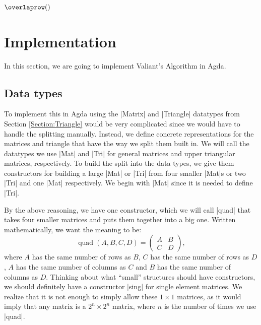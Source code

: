 $\overlaprow()$
\section{Implementation}
In this section, we are going to implement Valiant's Algorithm in Agda.
\subsection{Data types}
To implement this in Agda using the |Matrix| and |Triangle| datatypes from Section \ref{Section:Triangle} would be very complicated since we would have to handle the splitting manually. Instead, we define concrete representations for the matrices and triangle that have the way we split them built in.
We will call the datatypes we use |Mat| and |Tri| for general matrices and upper triangular matrices, respectively.
To build the split into the data types, we give them constructors for building a large |Mat| or |Tri| from four smaller |Mat|s or two |Tri| and one |Mat| respectively. We begin with |Mat| since it is needed to define |Tri|. 

By the above reasoning, we have one constructor, which we will call |quad| that takes four smaller matrices and puts them together into a big one. Written mathematically, we want the meaning to be:
\begin{equation*}
\operatorname{quad}(A,B,C,D) = 
\begin{pmatrix} 
  A & B \\
  C & D
\end{pmatrix},
\end{equation*}
where $A$ has the same number of rows as $B$, $C$ has the same number of rows as $D$, $A$ has the same number of columns as $C$ and $B$ has the same number of columns as $D$.
Thinking about what ``small'' structures should have constructors, we should definitely have a constructor |sing| for single element matrices. We realize that it is not enough to simply allow these $1 \times 1$ matrices, as it would imply that any matrix is a $2^n \times 2^n$ matrix, where $n$ is the number of times we use |quad|. 

